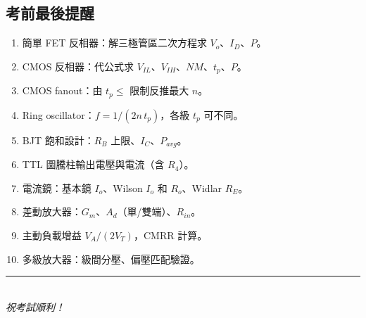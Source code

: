 \documentclass[10pt]{article}
\begin{document}
\subsection*{考前最後提醒}

\begin{tipbox}[十個最常考的計算題型]
\begin{enumerate}[leftmargin=2em,itemsep=1pt,topsep=1pt]
\item 簡單 FET 反相器：解三極管區二次方程求 $V_o$、$I_D$、$P$。
\item CMOS 反相器：代公式求 $V_{IL}$、$V_{IH}$、$NM$、$t_p$、$P$。
\item CMOS fanout：由 $t_p \le$ 限制反推最大 $n$。
\item Ring oscillator：$f = 1/(2n\,t_p)$，各級 $t_p$ 可不同。
\item BJT 飽和設計：$R_B$ 上限、$I_C$、$P_{avg}$。
\item TTL 圖騰柱輸出電壓與電流（含 $R_4$）。
\item 電流鏡：基本鏡 $I_o$、Wilson $I_o$ 和 $R_o$、Widlar $R_E$。
\item 差動放大器：$G_m$、$A_d$（單/雙端）、$R_{in}$。
\item 主動負載增益 $V_A/(2V_T)$，CMRR 計算。
\item 多級放大器：級間分壓、偏壓匹配驗證。
\end{enumerate}
\end{tipbox}

\vfill
\begin{center}
\small\color{maincol}\rule{0.6\textwidth}{0.4pt}\\[4pt]
{\itshape 祝考試順利！}
\end{center}
\end{document}
